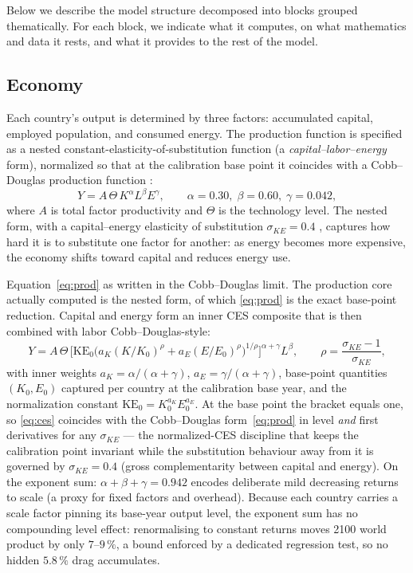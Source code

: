 \documentclass[a4paper,fleqn]{cas-sc}
\begin{document}
Below we describe the model structure decomposed into blocks grouped thematically. For each block, we indicate what it computes, on what mathematics and data it rests, and what it provides to the rest of the model.

\subsection{Economy}


Each country's output is determined by three factors: accumulated capital, employed population,
and consumed energy. The production function is specified as a nested constant-elasticity-of-sub\-sti\-tu\-tion
function (a \emph{capital--labor--energy} form), normalized so that at the calibration base point
it coincides with a Cobb--Douglas production function \citep{arrow1961}:
\begin{equation}
Y = A \, \Theta \, K^{\alpha} L^{\beta} E^{\gamma},
\qquad \alpha = 0.30,\; \beta = 0.60,\; \gamma = 0.042,
\label{eq:prod}
\end{equation}
where $A$ is total factor productivity and $\Theta$ is the technology level. The nested form, with a
capital--energy elasticity of substitution $\sigma_{KE}=0.4$ \citep{vanderwerf2008,koetse2008}, captures how hard it is to substitute
one factor for another: as energy becomes more expensive, the economy shifts toward capital and
reduces energy use.


Equation~\eqref{eq:prod} as written in the Cobb--Douglas limit. The
production core actually computed is the nested form, of which \eqref{eq:prod} is the exact
base-point reduction. Capital and energy form an inner CES composite that is then combined with
labor Cobb--Douglas-style:
\begin{equation}
Y = A\,\Theta\,\Big[\mathrm{KE}_0\big(a_K (K/K_0)^{\rho} + a_E (E/E_0)^{\rho}\big)^{1/\rho}\Big]^{\alpha+\gamma} L^{\beta},
\qquad \rho = \frac{\sigma_{KE}-1}{\sigma_{KE}},
\label{eq:ces}
\end{equation}
with inner weights $a_K = \alpha/(\alpha+\gamma)$, $a_E = \gamma/(\alpha+\gamma)$, base-point
quantities $(K_0, E_0)$ captured per country at the calibration base year, and the normalization
constant $\mathrm{KE}_0 = K_0^{a_K} E_0^{a_E}$. At the base point the bracket equals one, so
\eqref{eq:ces} coincides with the Cobb--Douglas form~\eqref{eq:prod} in level \emph{and} first
derivatives for any $\sigma_{KE}$ --- the normalized-CES discipline that keeps the calibration
point invariant while the substitution behaviour away from it is governed by $\sigma_{KE}=0.4$
(gross complementarity between capital and energy). On the exponent sum: $\alpha+\beta+\gamma =
0.942$ encodes deliberate mild decreasing returns to scale (a proxy for fixed factors and
overhead). Because each country carries a scale factor pinning its base-year output level, the
exponent sum has no compounding level effect: renormalising to constant returns moves 2100 world
product by only $7$--$9\,\%$, a bound enforced by a dedicated regression test, so no hidden
$5.8\,\%$ drag accumulates.
\end{document}
